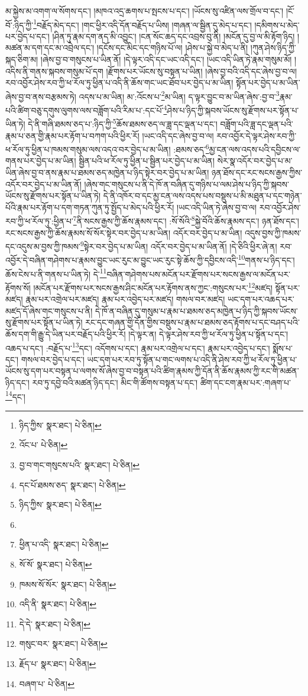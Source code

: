 མ་སྐྱེས་མ་འགག་ལ་སོགས་དང་། །མཁའ་འདྲ་ཆགས་པ་སྤངས་པ་དང་། །ཡོངས་སུ་འཛིན་ལས་གྲོལ་བ་དང་། །ངོ་བོ་:ཉིད་ཀྱི་\footnote{ཉིད་ཀྱིས་  སྣར་ཐང་།  པེ་ཅིན། }བརྗོད་མེད་དང་། །གང་ཕྱིར་འདི་དོན་བརྗོད་པ་ཡིས། །གཞན་ལ་སྦྱིན་དུ་མེད་པ་དང་། །དམིགས་པ་མེད་པར་བྱེད་པ་དང་། །ཤིན་ཏུ་རྣམ་དག་ནད་མི་འབྱུང་། །ངན་སོང་ཆད་དང་འབྲས་བུ་ནི། །མངོན་དུ་བྱ་ལ་མི་རྟོག་ཉིད། །མཚན་མ་དག་དང་མ་འབྲེལ་དང་། །དངོས་དང་མིང་དང་གཉིས་པོ་ལ། །ཤེས་པ་སྐྱེ་བ་མེད་པ་ནི། །ཀུན་ཤེས་ཉིད་ཀྱི་སྐད་ཅིག་མ། །ཞེས་བྱ་བ་གསུངས་པ་ཡིན་ནོ། །དེ་ལྟར་འདི་དང་ཡང་འདི་དང་། །ཡང་འདི་ཡིན་ཏེ་རྣམ་གསུམ་མོ། །འདིས་ནི་གནས་སྐབས་གསུམ་པོ་དག །རྫོགས་པར་ཡོངས་སུ་བསྟན་པ་ཡིན། །ཞེས་བྱ་བའི་འདི་དང་ཞེས་བྱ་བ་ལ། རབ་འབྱོར་ཤེས་རབ་ཀྱི་ཕ་རོལ་ཏུ་ཕྱིན་པ་འདི་ནི་ཆོས་གང་ཡང་ཐོབ་པར་བྱེད་པ་མ་ཡིན། སྟོན་པར་བྱེད་པ་མ་ཡིན་ཞེས་བྱ་བ་ནས་བརྩམས་ཏེ། འདས་པ་མ་ཡིན། མ་:འོངས་པ་\footnote{འོང་པ་  པེ་ཅིན། }མ་ཡིན། ད་ལྟར་བྱུང་བ་མ་ཡིན་ཞེས་:བྱ་བ་\footnote{བྱ་བ་གང་གསུངས་པའི་  སྣར་ཐང་།  པེ་ཅིན། }རྣམ་པའི་ཚིག་བཅུ་དགུས་ལུགས་ལས་བཟློག་པའི་རིམ་པ་:དང་པོ་\footnote{དང་པོ་ཐམས་ཅད་  སྣར་ཐང་།  པེ་ཅིན། }ཤེས་པ་ཉིད་ཀྱི་སྐབས་ཡོངས་སུ་རྫོགས་པར་སྟོན་པ་ཡིན་ཏེ། དེ་ནི་གཞི་ཐམས་ཅད་པ་:ཉིད་ཀྱི་\footnote{ཉིད་ཀྱིས་  སྣར་ཐང་།  པེ་ཅིན། }ཆོས་ཐམས་ཅད་ལ་ཟླ་དང་ལྡན་པ་དང་། བཟློག་པའི་ཟླ་དང་ལྡན་པའི་རྣམ་པ་ཅན་གྱི་རྣམ་པར་རྟོག་པ་བཀག་པའི་ཕྱིར་རོ། །ཡང་འདི་དང་ཞེས་བྱ་བ་ལ། རབ་འབྱོར་དེ་ལྟར་ཤེས་རབ་ཀྱི་ཕ་རོལ་ཏུ་ཕྱིན་པ་ཁམས་གསུམ་ལས་འདའ་བར་བྱེད་པ་མ་ཡིན། :ཐམས་ཅད་\footnote{}མྱ་ངན་ལས་འདས་པའི་དབྱིངས་ལ་གནས་པར་བྱེད་པ་མ་ཡིན། སྦྱིན་པའི་ཕ་རོལ་ཏུ་ཕྱིན་པ་སྦྱིན་པར་བྱེད་པ་མ་ཡིན། སེར་སྣ་འདོར་བར་བྱེད་པ་མ་ཡིན་ཞེས་བྱ་བ་ནས་རྣམ་པ་ཐམས་ཅད་མཁྱེན་པ་ཉིད་སྟེར་བར་བྱེད་པ་མ་ཡིན། ཉན་ཐོས་དང་རང་སངས་རྒྱས་ཀྱིས་འདོར་བར་བྱེད་པ་མ་ཡིན་ནོ། །ཞེས་གང་གསུངས་པ་ནི་དེ་ཁོ་ན་བཞིན་དུ་གཉིས་པ་ལམ་ཤེས་པ་ཉིད་ཀྱི་སྐབས་ཡོངས་སུ་རྫོགས་པར་སྟོན་པ་ཡིན་ཏེ། དེ་ནི་འཁོར་བ་དང་མྱ་ངན་ལས་འདས་པས་བསྡུས་པ་མི་མཐུན་པ་དང་གཉེན་པོའི་རྣམ་པར་རྟོག་པ་དག་གཏན་ཀུན་ཏུ་སྤྱོད་པ་མེད་པའི་ཕྱིར་རོ། །ཡང་འདི་ཡིན་ཏེ་ཞེས་བྱ་བ་ལ། རབ་འབྱོར་ཤེས་རབ་ཀྱི་ཕ་རོལ་ཏུ་:ཕྱིན་པ་\footnote{ཕྱིན་པ་འདི་  སྣར་ཐང་།  པེ་ཅིན། }ནི་སངས་རྒྱས་ཀྱི་ཆོས་རྣམས་དང་། :སོ་སོའི་\footnote{སོ་སོ་  སྣར་ཐང་།  པེ་ཅིན། }སྐྱེ་བོའི་ཆོས་རྣམས་དང་། ཉན་ཐོས་དང་། རང་སངས་རྒྱས་ཀྱི་ཆོས་རྣམས་སོ་སོར་སྟེར་བར་བྱེད་པ་མ་ཡིན། འདོར་བར་བྱེད་པ་མ་ཡིན། འདུས་བྱས་ཀྱི་ཁམས་དང་འདུས་མ་བྱས་ཀྱི་ཁམས་\footnote{ཁམས་སོ་སོར་  སྣར་ཐང་།  པེ་ཅིན། }སྟེར་བར་བྱེད་པ་མ་ཡིན། འདོར་བར་བྱེད་པ་མ་ཡིན་ནོ། །དེ་ཅིའི་ཕྱིར་ཞེ་ན། རབ་འབྱོར་དེ་བཞིན་གཤེགས་པ་རྣམས་བྱུང་ཡང་རུང་མ་བྱུང་ཡང་རུང་སྟེ་ཆོས་ཀྱི་དབྱིངས་འདི་\footnote{འདི་ནི་  སྣར་ཐང་།  པེ་ཅིན། }གནས་པ་ཉིད་དང་། ཆོས་ངེས་པ་ནི་གནས་པ་ཡིན་ཏེ། དེ་\footnote{དེ་དེ་  སྣར་ཐང་།  པེ་ཅིན། }བཞིན་གཤེགས་པས་མངོན་པར་རྫོགས་པར་སངས་རྒྱས་ལ་མངོན་པར་རྟོགས་སོ། །མངོན་པར་རྫོགས་པར་སངས་རྒྱས་ཤིང་མངོན་པར་རྟོགས་ནས་ཀྱང་:གསུངས་པར་\footnote{གསུང་བར་  སྣར་ཐང་།  པེ་ཅིན། }མཛད། སྟོན་པར་མཛད། རྣམ་པར་འགྲེལ་པར་མཛད། རྣམ་པར་འབྱེད་པར་མཛད། གསལ་བར་མཛད། ཡང་དག་པར་འཆད་པར་མཛད་དོ་ཞེས་གང་གསུངས་པ་ནི། དེ་ཁོ་ན་བཞིན་དུ་གསུམ་པ་རྣམ་པ་ཐམས་ཅད་མཁྱེན་པ་ཉིད་ཀྱི་སྐབས་ཡོངས་སུ་རྫོགས་པར་སྟོན་པ་ཡིན་ཏེ། རང་དང་གཞན་གྱི་དོན་གྱིས་བསྡུས་པ་རྣམ་པ་ཐམས་ཅད་རྟོགས་པ་དང་བཤད་པའི་ཆོས་དག་གི་རྒྱུ་དེ་ཡིན་པར་བརྗོད་པའི་ཕྱིར་རོ། །དེ་ལྟར་ན། དེ་ལྟར་ཤེས་རབ་ཀྱི་ཕ་རོལ་ཏུ་ཕྱིན་པ་སྟོན་པ་དང་། འཆད་པ་དང་། :བརྗོད་པ་\footnote{རྗོད་པ་  སྣར་ཐང་།  པེ་ཅིན། }དང་། འདོགས་པ་དང་། རྣམ་པར་འགྲེལ་པ་དང་། རྣམ་པར་འབྱེད་པ་དང་། སྨོས་པ་དང་། གསལ་བར་བྱེད་པ་དང་། ཡང་དག་པར་རབ་ཏུ་སྟོན་པ་གང་ལགས་པ་འདི་ནི་ཤེས་རབ་ཀྱི་ཕ་རོལ་ཏུ་ཕྱིན་པ་ཡོངས་སུ་དག་པར་བསྟན་པ་ལགས་སོ་ཞེས་བྱ་བ་བསྟན་པའི་ཚིག་རྣམས་ཀྱི་དོན་ནི་ཆོས་རྣམས་ཀྱི་རང་གི་མཚན་ཉིད་དང་། རབ་ཏུ་དབྱེ་བའི་མཚན་ཉིད་དང་། མིང་གི་ཚོགས་བསྟན་པ་དང་། ཚིག་དང་ངག་རྣམ་པར་:གཞག་པ་\footnote{བཞག་པ་  པེ་ཅིན། }དང་། 